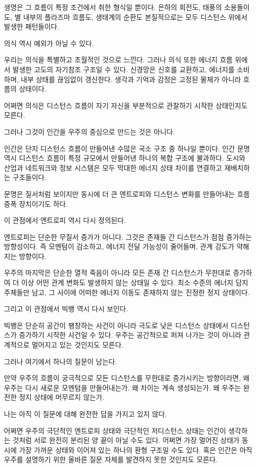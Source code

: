 \documentclass[12pt]{article}
\begin{document}
생명은 그 흐름이 특정 조건에서 취한 형식일 뿐이다. 은하의 회전도, 태풍의 소용돌이도, 별 내부의 플라즈마 흐름도, 생태계의 순환도 본질적으로는 모두 디스턴스 위에서 발생한 패턴들이다.

의식 역시 예외가 아닐 수 있다.

우리는 의식을 특별하고 초월적인 것으로 느낀다. 그러나 의식 또한 에너지 흐름 위에서 발생한 고도의 자기참조 구조일 수 있다. 신경망은 신호를 교환하고, 에너지를 소비하며, 내부 상태를 끊임없이 갱신한다. 생각과 기억과 감정은 고정된 물체가 아니라 흐름의 상태이다.

어쩌면 의식은 디스턴스 흐름이 자기 자신을 부분적으로 관찰하기 시작한 상태인지도 모른다.

그러나 그것이 인간을 우주의 중심으로 만드는 것은 아니다.

인간은 단지 디스턴스 흐름이 만들어낸 수많은 국소 구조 중 하나일 뿐이다. 인간 문명 역시 디스턴스 흐름이 특정 규모에서 만들어낸 하나의 복합 구조에 불과하다. 도시와 산업과 네트워크와 정보 시스템은 모두 막대한 에너지 상태 차이를 연결하고 재배치하는 구조들이다.

문명은 질서처럼 보이지만 동시에 더 큰 엔트로피와 디스턴스 변화를 만들어내는 흐름 증폭 장치이기도 하다.

이 관점에서 엔트로피 역시 다시 정의된다.

엔트로피는 단순한 무질서 증가가 아니다. 그것은 존재들 간 디스턴스가 점점 증가하는 방향성이다. 즉 모멘텀이 감소하고, 에너지 전달 가능성이 줄어들며, 관계 강도가 약해지는 방향이다.

우주의 마지막은 단순한 열적 죽음이 아니라 모든 존재 간 디스턴스가 무한대로 증가하여 더 이상 어떤 관계 변화도 발생하지 않는 상태일 수 있다. 최소 수준의 에너지 담지 주체들만 남고, 그 사이에 어떠한 에너지 이동도 존재하지 않는 진정한 정지 상태이다.

그리고 이 관점에서 빅뱅 역시 다시 보인다.

빅뱅은 단순히 공간이 팽창하는 사건이 아니라 극도로 낮은 디스턴스 상태에서 디스턴스가 증가하기 시작한 사건일 수 있다. 우주는 공간적으로 퍼져 나가는 것이 아니라 관계적으로 멀어지고 있는 것인지도 모른다.

그러나 여기에서 하나의 질문이 남는다.

만약 우주의 흐름이 궁극적으로 모든 디스턴스를 무한대로 증가시키는 방향이라면, 왜 우주는 다시 새로운 모멘텀을 만들어내는가. 왜 차이는 계속 생성되는가. 왜 우주는 완전한 정지 상태에 머무르지 않는가.

나는 아직 이 질문에 대해 완전한 답을 가지고 있지 않다.

어쩌면 우주의 극단적인 엔트로피 상태와 극단적인 저디스턴스 상태는 인간이 생각하는 것처럼 서로 완전히 분리된 양 끝이 아닐 수도 있다. 어쩌면 가장 멀어진 상태가 동시에 가장 가까운 상태와 이어져 있는 하나의 환형 구조일 수도 있다. 혹은 인간은 아직 우주를 설명하기 위한 올바른 질문 자체를 발견하지 못한 것인지도 모른다.
\end{document}
